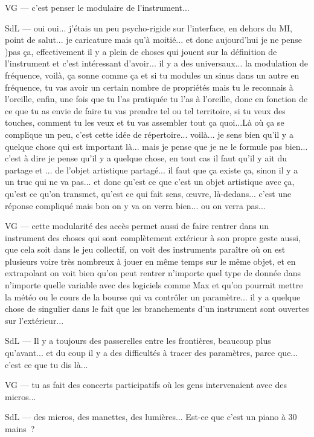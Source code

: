 VG — c'est penser le modulaire de l'instrument... 

SdL — oui oui... j'étais un peu psycho-rigide sur l'interface, en dehors du MI, point de salut... je caricature mais qu'à moitié... et donc aujourd'hui je ne pense )pas ça, effectivement il y a plein de choses qui jouent sur la définition de l'instrument et c'est intéressant d'avoir... il y a des universaux... la modulation de fréquence, voilà, ça sonne comme ça et si tu modules un sinus dans un autre en fréquence, tu vas avoir un certain nombre de propriétés mais tu le reconnais à l'oreille, enfin, une fois que tu l'as pratiquée tu l'as à l'oreille, donc en fonction de ce que tu as envie de faire tu vas prendre tel ou tel territoire, si tu veux des touches, comment tu les veux et tu vas assembler tout ça quoi...Là où ça se complique un peu, c'est cette idée de répertoire... voilà... je sens bien qu'il y a quelque chose qui est important là... mais je pense que je ne le formule pas bien... c'est à dire je pense qu'il y a quelque chose, en tout cas il faut qu'il y ait du partage et ... de l'objet artistique partagé... il faut que ça existe ça, sinon il y a un truc qui ne va pas... et donc qu'est ce que c'est un objet artistique avec ça, qu'est ce qu'on transmet, qu'est ce qui fait sens, œuvre, là-dedans... c'est une réponse compliqué mais bon on y va on verra bien... ou on verra pas... 

VG — cette modularité des accès permet aussi de faire rentrer dans un instrument des choses qui sont complètement extérieur à son propre geste aussi, que cela soit dans le jeu collectif, on voit des instruments paraître où on est plusieurs voire très nombreux à jouer en même temps sur le même objet, et en extrapolant on voit bien qu'on peut rentrer n'importe quel type de donnée dans n'importe quelle variable avec des logiciels comme Max et qu'on pourrait mettre la météo ou le cours de la bourse qui va contrôler un paramètre... il y a quelque chose de singulier dans le fait que les branchements d'un instrument sont ouvertes sur l'extérieur... 

SdL — Il y a toujours des passerelles entre les frontières, beaucoup plus qu'avant... et du coup il y a des difficultés à tracer des paramètres, parce que... c'est ce que tu dis là...  

VG — tu as fait des concerts participatifs où les gens intervenaient avec des micros... 

SdL — des micros, des manettes, des lumières... Est-ce que c'est un piano à 30 mains ?  

